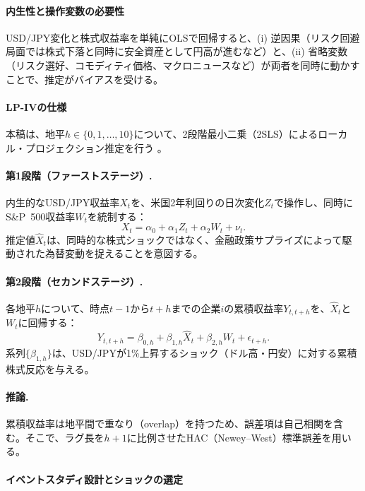 \documentclass[12pt,a4paper]{article}
\begin{document}
\paragraph{内生性と操作変数の必要性}

USD/JPY変化と株式収益率を単純にOLSで回帰すると、(i) 逆因果（リスク回避局面では株式下落と同時に安全資産として円高が進むなど）と、(ii) 省略変数（リスク選好、コモディティ価格、マクロニュースなど）が両者を同時に動かすことで、推定がバイアスを受ける。

\paragraph{LP-IVの仕様}

本稿は、地平$h \in \{0,1,\ldots,10\}$について、2段階最小二乗（2SLS）によるローカル・プロジェクション推定を行う \citep{jorda2005}。

\paragraph{第1段階（ファーストステージ）.}
内生的なUSD/JPY収益率$X_t$を、米国2年利回りの日次変化$Z_t$で操作し、同時にS\&P~500収益率$W_t$を統制する：
\begin{equation}
X_t = \alpha_0 + \alpha_1 Z_t + \alpha_2 W_t + \nu_t.
\end{equation}
推定値$\widehat{X}_t$は、同時的な株式ショックではなく、金融政策サプライズによって駆動された為替変動を捉えることを意図する。

\paragraph{第2段階（セカンドステージ）.}
各地平$h$について、時点$t-1$から$t+h$までの企業$i$の累積収益率$Y_{t,t+h}$を、$\widehat{X}_t$と$W_t$に回帰する：
\begin{equation}
Y_{t,t+h} = \beta_{0,h} + \beta_{1,h} \widehat{X}_t + \beta_{2,h} W_t + \epsilon_{t+h}.
\end{equation}
系列$\{\beta_{1,h}\}$は、USD/JPYが1\%上昇するショック（ドル高・円安）に対する累積株式反応を与える。

\paragraph{推論.}
累積収益率は地平間で重なり（overlap）を持つため、誤差項は自己相関を含む。そこで、ラグ長を$h+1$に比例させたHAC（Newey--West）標準誤差を用いる。

\paragraph{イベントスタディ設計とショックの選定}
\end{document}
